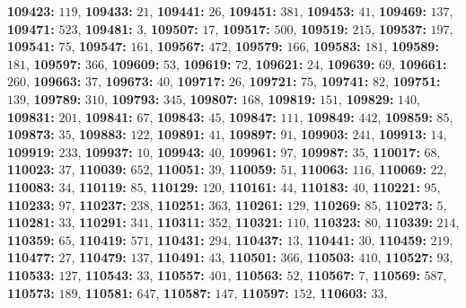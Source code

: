\textsf{\bfseries 109423:} $119$, \textsf{\bfseries 109433:} $21$, \textsf{\bfseries 109441:} $26$, \textsf{\bfseries 109451:} $381$, \textsf{\bfseries 109453:} $41$, \textsf{\bfseries 109469:} $137$, \textsf{\bfseries 109471:} $523$, \textsf{\bfseries 109481:} $3$, \textsf{\bfseries 109507:} $17$, \textsf{\bfseries 109517:} $500$, \textsf{\bfseries 109519:} $215$, \textsf{\bfseries 109537:} $197$, \textsf{\bfseries 109541:} $75$, \textsf{\bfseries 109547:} $161$, \textsf{\bfseries 109567:} $472$, \textsf{\bfseries 109579:} $166$, \textsf{\bfseries 109583:} $181$, \textsf{\bfseries 109589:} $181$, \textsf{\bfseries 109597:} $366$, \textsf{\bfseries 109609:} $53$, \textsf{\bfseries 109619:} $72$, \textsf{\bfseries 109621:} $24$, \textsf{\bfseries 109639:} $69$, \textsf{\bfseries 109661:} $260$, \textsf{\bfseries 109663:} $37$, \textsf{\bfseries 109673:} $40$, \textsf{\bfseries 109717:} $26$, \textsf{\bfseries 109721:} $75$, \textsf{\bfseries 109741:} $82$, \textsf{\bfseries 109751:} $139$, \textsf{\bfseries 109789:} $310$, \textsf{\bfseries 109793:} $345$, \textsf{\bfseries 109807:} $168$, \textsf{\bfseries 109819:} $151$, \textsf{\bfseries 109829:} $140$, \textsf{\bfseries 109831:} $201$, \textsf{\bfseries 109841:} $67$, \textsf{\bfseries 109843:} $45$, \textsf{\bfseries 109847:} $111$, \textsf{\bfseries 109849:} $442$, \textsf{\bfseries 109859:} $85$, \textsf{\bfseries 109873:} $35$, \textsf{\bfseries 109883:} $122$, \textsf{\bfseries 109891:} $41$, \textsf{\bfseries 109897:} $91$, \textsf{\bfseries 109903:} $241$, \textsf{\bfseries 109913:} $14$, \textsf{\bfseries 109919:} $233$, \textsf{\bfseries 109937:} $10$, \textsf{\bfseries 109943:} $40$, \textsf{\bfseries 109961:} $97$, \textsf{\bfseries 109987:} $35$, \textsf{\bfseries 110017:} $68$, \textsf{\bfseries 110023:} $37$, \textsf{\bfseries 110039:} $652$, \textsf{\bfseries 110051:} $39$, \textsf{\bfseries 110059:} $51$, \textsf{\bfseries 110063:} $116$, \textsf{\bfseries 110069:} $22$, \textsf{\bfseries 110083:} $34$, \textsf{\bfseries 110119:} $85$, \textsf{\bfseries 110129:} $120$, \textsf{\bfseries 110161:} $44$, \textsf{\bfseries 110183:} $40$, \textsf{\bfseries 110221:} $95$, \textsf{\bfseries 110233:} $97$, \textsf{\bfseries 110237:} $238$, \textsf{\bfseries 110251:} $363$, \textsf{\bfseries 110261:} $129$, \textsf{\bfseries 110269:} $85$, \textsf{\bfseries 110273:} $5$, \textsf{\bfseries 110281:} $33$, \textsf{\bfseries 110291:} $341$, \textsf{\bfseries 110311:} $352$, \textsf{\bfseries 110321:} $110$, \textsf{\bfseries 110323:} $80$, \textsf{\bfseries 110339:} $214$, \textsf{\bfseries 110359:} $65$, \textsf{\bfseries 110419:} $571$, \textsf{\bfseries 110431:} $294$, \textsf{\bfseries 110437:} $13$, \textsf{\bfseries 110441:} $30$, \textsf{\bfseries 110459:} $219$, \textsf{\bfseries 110477:} $27$, \textsf{\bfseries 110479:} $137$, \textsf{\bfseries 110491:} $43$, \textsf{\bfseries 110501:} $366$, \textsf{\bfseries 110503:} $410$, \textsf{\bfseries 110527:} $93$, \textsf{\bfseries 110533:} $127$, \textsf{\bfseries 110543:} $33$, \textsf{\bfseries 110557:} $401$, \textsf{\bfseries 110563:} $52$, \textsf{\bfseries 110567:} $7$, \textsf{\bfseries 110569:} $587$, \textsf{\bfseries 110573:} $189$, \textsf{\bfseries 110581:} $647$, \textsf{\bfseries 110587:} $147$, \textsf{\bfseries 110597:} $152$, \textsf{\bfseries 110603:} $33$, 

